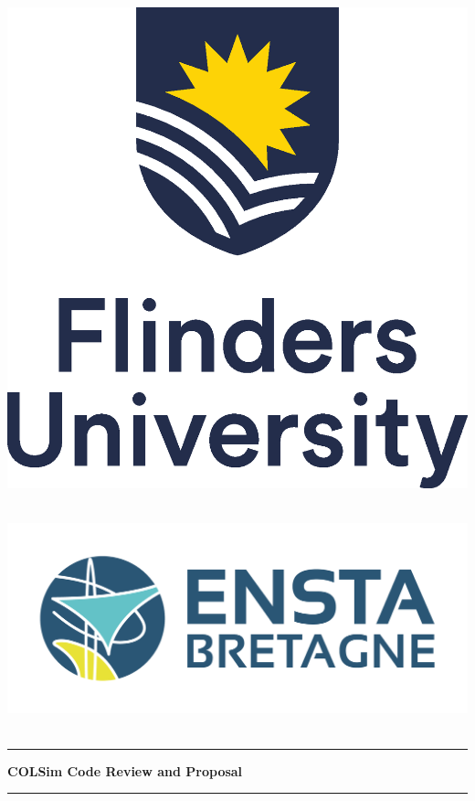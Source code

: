 \begin{titlepage}
    \begin{center}
    \vspace{1cm}
    \begin{minipage}[c]{0.6\linewidth}
        \centering
        \includegraphics[width=0.6\linewidth]{root/Flinders_University_Logo_Stacked_RGB_Master.eps}~\\[1cm]
    \end{minipage}\vspace{0.5cm}
    \begin{minipage}[c]{0.6\linewidth}
        \centering
        \includegraphics[width=0.9\linewidth]{root/ENSTA-LogoH-COULEUR.png}~\\[1cm]
    \end{minipage}
    \vspace{1cm}
    
    \hrule
    \vspace{.5cm}
    {\huge \bfseries COLSim Code Review and Proposal} %
    \vspace{.5cm}
    \hrule

    \vspace{1.5cm}
    

\end{center}
\end{titlepage}
